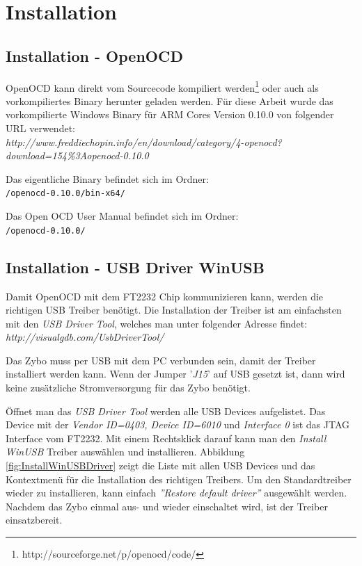 \section{Installation}
\subsection{Installation - OpenOCD}
OpenOCD kann direkt vom Sourcecode kompiliert werden\footnote{http://sourceforge.net/p/openocd/code/} oder auch als vorkompiliertes Binary herunter geladen werden.
Für diese Arbeit wurde das vorkompilierte Windows Binary für ARM Cores Version 0.10.0 von folgender URL verwendet:\\
\textit{http://www.freddiechopin.info/en/download/category/4-openocd?download=154\%3Aopenocd-0.10.0}

Das eigentliche Binary befindet sich im Ordner:\\
\texttt{/openocd-0.10.0/bin-x64/} 

Das Open OCD User Manual\cite{bib:OpenOCDDoku} befindet sich im Ordner:\\
\texttt{/openocd-0.10.0/} 


\subsection{Installation - USB Driver WinUSB}
\label{kapitel:usbTreiber}
Damit OpenOCD mit dem FT2232 Chip kommunizieren kann, werden die richtigen USB Treiber benötigt.
Die Installation der Treiber ist am einfachsten mit den \textit{USB Driver Tool}, welches man unter folgender Adresse findet:\\
\textit{http://visualgdb.com/UsbDriverTool/}

Das Zybo muss per USB mit dem PC verbunden sein, damit der Treiber installiert werden kann.
Wenn der Jumper '\textit{J15}' auf USB gesetzt ist, dann wird keine zusätzliche Stromversorgung für das Zybo benötigt.

Öffnet man das \textit{USB Driver Tool} werden alle USB Devices aufgelistet.
Das Device mit der \textit{Vendor ID=0403, Device ID=6010} und \textit{Interface 0} ist das JTAG Interface vom FT2232.
Mit einem Rechtsklick darauf kann man den \textit{Install WinUSB} Treiber auswählen und installieren.
Abbildung \ref{fig:InstallWinUSBDriver} zeigt die Liste mit allen USB Devices und das Kontextmenü für die Installation des richtigen Treibers.
Um den Standardtreiber wieder zu installieren, kann einfach \textit{''Restore default driver''} ausgewählt werden.
Nachdem das Zybo einmal aus- und wieder einschaltet wird, ist der Treiber einsatzbereit.

